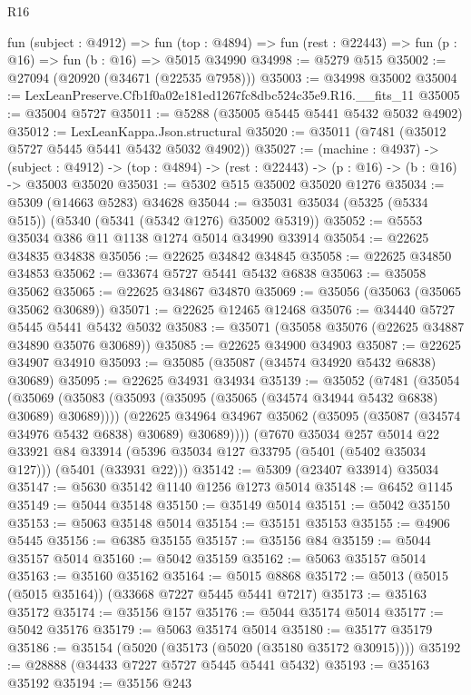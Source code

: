 \begin{lexlean}{R16}
\begin{coremodule}
  fun (subject : @4912) =>
  fun (top : @4894) => fun (rest : @22443) => fun (p : @16) => fun (b : @16) => @5015 @34990
@34998 := @5279 @515
@35002 := @27094 (@20920 (@34671 (@22535 @7958)))
@35003 := @34998 @35002
@35004 := LexLeanPreserve.Cfb1f0a02e181ed1267fc8dbc524c35e9.R16.__fits_11
@35005 := @35004 @5727
@35011 := @5288 (@35005 @5445 @5441 @5432 @5032 @4902)
@35012 := LexLeanKappa.Json.structural
@35020 := @35011 (@7481 (@35012 @5727 @5445 @5441 @5432 @5032 @4902))
@35027 := (machine : @4937) ->
  (subject : @4912) -> (top : @4894) -> (rest : @22443) -> (p : @16) -> (b : @16) -> @35003 @35020
@35031 := @5302 @515 @35002 @35020 @1276
@35034 := @5309 (@14663 @5283) @34628
@35044 := @35031 @35034 (@5325 (@5334 @515)) (@5340 (@5341 (@5342 @1276) @35002 @5319))
@35052 := @5553 @35034 @386 @11 @1138 @1274 @5014 @34990 @33914
@35054 := @22625 @34835 @34838
@35056 := @22625 @34842 @34845
@35058 := @22625 @34850 @34853
@35062 := @33674 @5727 @5441 @5432 @6838
@35063 := @35058 @35062
@35065 := @22625 @34867 @34870
@35069 := @35056 (@35063 (@35065 @35062 @30689))
@35071 := @22625 @12465 @12468
@35076 := @34440 @5727 @5445 @5441 @5432 @5032
@35083 := @35071 (@35058 @35076 (@22625 @34887 @34890 @35076 @30689))
@35085 := @22625 @34900 @34903
@35087 := @22625 @34907 @34910
@35093 := @35085 (@35087 (@34574 @34920 @5432 @6838) @30689)
@35095 := @22625 @34931 @34934
@35139 := @35052
    (@7481
      (@35054
        (@35069 (@35083 (@35093 (@35095 (@35065 (@34574 @34944 @5432 @6838) @30689) @30689))))
        (@22625 @34964 @34967 @35062 (@35095 (@35087 (@34574 @34976 @5432 @6838) @30689) @30689))))
    (@7670
      @35034
      @257
      @5014
      @22
      @33921
      @84
      @33914
      (@5396 @35034 @127 @33795 (@5401 (@5402 @35034 @127)))
      (@5401 (@33931 @22)))
@35142 := @5309 (@23407 @33914) @35034
@35147 := @5630 @35142 @1140 @1256 @1273 @5014
@35148 := @6452 @1145
@35149 := @5044 @35148
@35150 := @35149 @5014
@35151 := @5042 @35150
@35153 := @5063 @35148 @5014
@35154 := @35151 @35153
@35155 := @4906 @5445
@35156 := @6385 @35155
@35157 := @35156 @84
@35159 := @5044 @35157 @5014
@35160 := @5042 @35159
@35162 := @5063 @35157 @5014
@35163 := @35160 @35162
@35164 := @5015 @8868
@35172 := @5013 (@5015 (@5015 @35164)) (@33668 @7227 @5445 @5441 @7217)
@35173 := @35163 @35172
@35174 := @35156 @157
@35176 := @5044 @35174 @5014
@35177 := @5042 @35176
@35179 := @5063 @35174 @5014
@35180 := @35177 @35179
@35186 := @35154 (@5020 (@35173 (@5020 (@35180 @35172 @30915))))
@35192 := @28888 (@34433 @7227 @5727 @5445 @5441 @5432)
@35193 := @35163 @35192
@35194 := @35156 @243

\end{coremodule}
\end{lexlean}
